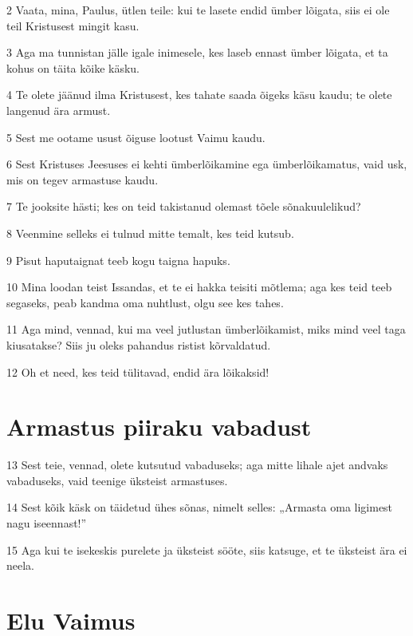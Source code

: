 \par 2 Vaata, mina, Paulus, ütlen teile: kui te lasete endid ümber lõigata, siis ei ole teil Kristusest mingit kasu.
\par 3 Aga ma tunnistan jälle igale inimesele, kes laseb ennast ümber lõigata, et ta kohus on täita kõike käsku.
\par 4 Te olete jäänud ilma Kristusest, kes tahate saada õigeks käsu kaudu; te olete langenud ära armust.
\par 5 Sest me ootame usust õiguse lootust Vaimu kaudu.
\par 6 Sest Kristuses Jeesuses ei kehti ümberlõikamine ega ümberlõikamatus, vaid usk, mis on tegev armastuse kaudu.
\par 7 Te jooksite hästi; kes on teid takistanud olemast tõele sõnakuulelikud?
\par 8 Veenmine selleks ei tulnud mitte temalt, kes teid kutsub.
\par 9 Pisut haputaignat teeb kogu taigna hapuks.
\par 10 Mina loodan teist Issandas, et te ei hakka teisiti mõtlema; aga kes teid teeb segaseks, peab kandma oma nuhtlust, olgu see kes tahes.
\par 11 Aga mind, vennad, kui ma veel jutlustan ümberlõikamist, miks mind veel taga kiusatakse? Siis ju oleks pahandus ristist kõrvaldatud.
\par 12 Oh et need, kes teid tülitavad, endid ära lõikaksid!

\section*{Armastus piiraku vabadust}

\par 13 Sest teie, vennad, olete kutsutud vabaduseks; aga mitte lihale ajet andvaks vabaduseks, vaid teenige üksteist armastuses.
\par 14 Sest kõik käsk on täidetud ühes sõnas, nimelt selles: „Armasta oma ligimest nagu iseennast!”
\par 15 Aga kui te isekeskis purelete ja üksteist sööte, siis katsuge, et te üksteist ära ei neela.

\section*{Elu Vaimus}

